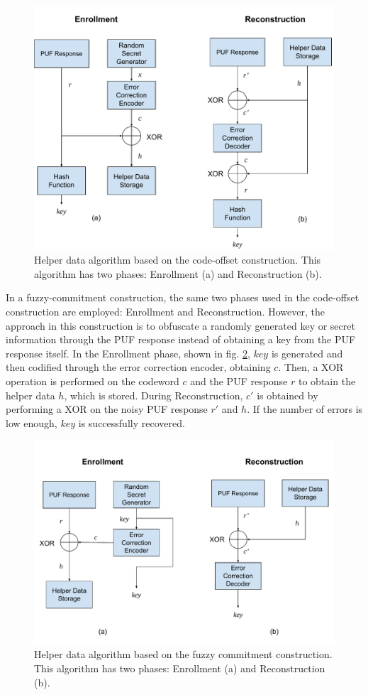\begin{figure}[H]
    \centering
    \includegraphics[width=12.5cm]{images/code offset.pdf}
    \caption{Helper data algorithm based on the code-offset construction. This algorithm has two phases: Enrollment (a) and Reconstruction (b).}
    \label{fig:HDA}
\end{figure}

In a fuzzy-commitment construction, the same two phases used in the code-offset construction are employed: Enrollment and Reconstruction. However, the approach in this construction is to obfuscate a randomly generated key or secret information through the PUF response instead of obtaining a key from the PUF response itself. In the Enrollment phase, shown in fig. \ref{fig:commitment}, $key$ is generated and then codified through the error correction encoder, obtaining $c$. Then, a XOR operation is performed on the codeword $c$ and the PUF response $r$ to obtain the helper data $h$, which is stored. During Reconstruction, $c'$ is obtained by performing a XOR on the noisy PUF response $r'$ and $h$. If the number of errors is low enough, $key$ is successfully recovered.

\begin{figure}[H]
    \centering
    \includegraphics[width=13cm]{images/Fuzzy commitment.pdf}
    \caption{Helper data algorithm based on the fuzzy commitment construction. This algorithm has two phases: Enrollment (a) and Reconstruction (b).}
    \label{fig:commitment}
\end{figure}

